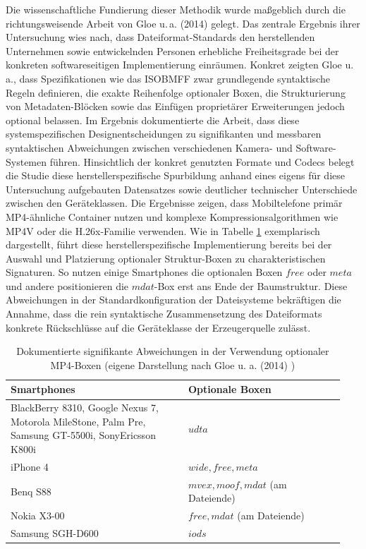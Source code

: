 Die wissenschaftliche Fundierung dieser Methodik wurde maßgeblich durch die richtungsweisende Arbeit von Gloe u.\,a. (2014) gelegt. Das zentrale Ergebnis ihrer Untersuchung wies nach, dass Dateiformat-Standards den herstellenden Unternehmen sowie entwickelnden Personen erhebliche Freiheitsgrade bei der konkreten softwareseitigen Implementierung einräumen. Konkret zeigten Gloe u.\,a., dass Spezifikationen wie das ISOBMFF zwar grundlegende syntaktische Regeln definieren, die exakte Reihenfolge optionaler Boxen, die Strukturierung von Metadaten-Blöcken sowie das Einfügen proprietärer Erweiterungen jedoch optional belassen. Im Ergebnis dokumentierte die Arbeit, dass diese systemspezifischen Designentscheidungen zu signifikanten und messbaren syntaktischen Abweichungen zwischen verschiedenen Kamera- und Software-Systemen führen. Hinsichtlich der konkret genutzten Formate und Codecs belegt die Studie diese herstellerspezifische Spurbildung anhand eines eigens für diese Untersuchung aufgebauten Datensatzes sowie deutlicher technischer Unterschiede zwischen den Geräteklassen. Die Ergebnisse zeigen, dass Mobiltelefone primär MP4-ähnliche Container nutzen und komplexe Kompressionsalgorithmen wie MP4V oder die H.26x-Familie verwenden. Wie in Tabelle \ref{tab:gloe} exemplarisch dargestellt, führt diese herstellerspezifische Implementierung bereits bei der Auswahl und Platzierung optionaler Struktur-Boxen zu charakteristischen Signaturen. So nutzen einige Smartphones die optionalen Boxen \(free\) oder \(meta\) und andere positionieren die \(mdat\)-Box erst ans Ende der Baumstruktur. Diese Abweichungen in der Standardkonfiguration der Dateisysteme bekräftigen die Annahme, dass die rein syntaktische Zusammensetzung des Dateiformats konkrete Rückschlüsse auf die Geräteklasse der Erzeugerquelle zulässt.\cite[S. S68-69]{gloe_forensic_2014}

\begin{table}[htbp]
    \centering
    \begin{tabular}{>{\raggedright\arraybackslash}p{0.5\linewidth}>{\raggedright\arraybackslash}p{0.44\linewidth}}\toprule
         \textbf{Smartphones}& \textbf{Optionale Boxen}\\\midrule
         BlackBerry 8310, Google Nexus 7, Motorola MileStone, Palm Pre, Samsung GT-5500i, SonyEricsson K800i& \(udta\)\\\midrule
         iPhone 4& \(wide, free, meta\)\\\midrule
         Benq S88& \(mvex, moof, mdat\) (am Dateiende)\\\midrule
         Nokia X3-00 & \(free, mdat\) (am Dateiende)\\\midrule
         Samsung SGH-D600& \(iods\)\\ \bottomrule
    \end{tabular}
    \caption{Dokumentierte signifikante Abweichungen in der Verwendung optionaler MP4-Boxen (eigene Darstellung nach Gloe u. a. (2014) \cite[Tab. 4]{gloe_forensic_2014})}
    \label{tab:gloe}
\end{table}

